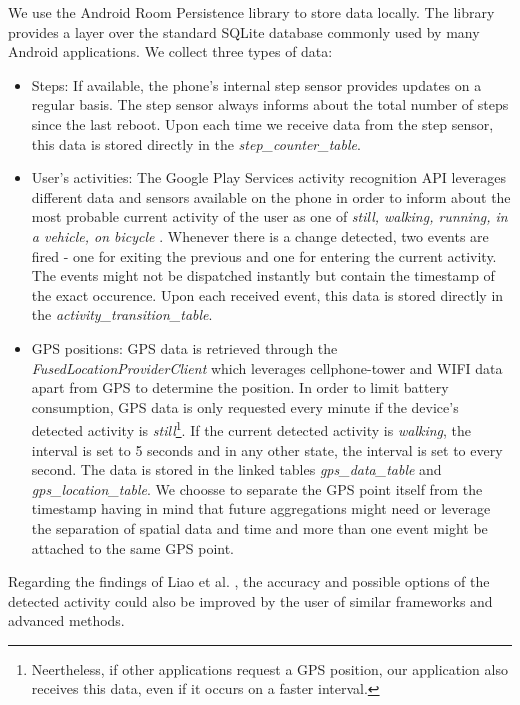 We use the Android Room Persistence library \parencite{room} to store data locally. The library provides a layer over the standard SQLite database commonly used by many Android applications. We collect three types of data:
\begin{itemize}
	\item Steps: If available, the phone's internal step sensor provides updates on a regular basis. The step sensor always informs about the total number of steps since the last reboot. Upon each time we receive data from the step sensor, this data is stored directly in the \textit{step\_counter\_table}.
	\item User's activities: The Google Play Services  activity recognition API leverages different data and sensors available on the phone in order to inform about the most probable current activity of the user as one of \textit{still, walking, running, in a vehicle, on bicycle} \parencite{detected-activity}. Whenever there is a change detected, two events are fired - one for exiting the previous and one for entering the current activity. The events might not be dispatched instantly but contain the timestamp of the exact occurence. Upon each received event, this data is stored directly in the \textit{activity\_transition\_table}.
	\item GPS positions: GPS data is retrieved through the \textit{FusedLocationProviderClient} which leverages cellphone-tower and WIFI data apart from GPS to determine the position. In order to limit battery consumption, GPS data is only requested every minute if the device's detected activity is \textit{still}\footnote{Neertheless, if other applications request a GPS position, our application also receives this data, even if it occurs on a faster interval.}. If the current detected activity is \textit{walking}, the interval is set to 5 seconds and in any other state, the interval is set to every second. The data is stored in the linked tables \textit{gps\_data\_table} and \textit{gps\_location\_table}. We choosse to separate the GPS point itself from the timestamp having in mind that future aggregations might need or leverage the separation of spatial data and time and more than one event might be attached to the same GPS point.
\end{itemize}

Regarding the findings of Liao et al. \parencite{liao2005location}, the accuracy and possible options of the detected activity could also be improved by the user of similar frameworks and advanced methods.

